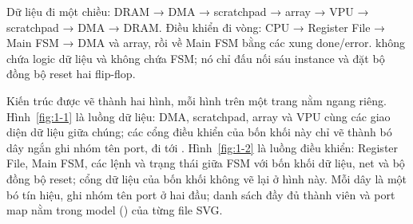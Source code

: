 Dữ liệu đi một chiều: DRAM → DMA → scratchpad → array → VPU → scratchpad → DMA → DRAM. Điều khiển đi
vòng: CPU → Register File → Main FSM → DMA và array, rồi về Main FSM bằng các xung done/error.
 không chứa logic dữ liệu và không chứa FSM; nó chỉ đấu nối sáu instance và đặt
bộ đồng bộ reset hai flip-flop.

Kiến trúc được vẽ thành hai hình, mỗi hình trên một trang nằm ngang riêng. Hình~\ref{fig:1-1} là
luồng dữ liệu: DMA, scratchpad, array và VPU cùng các giao diện dữ liệu giữa chúng; các cổng điều khiển
của bốn khối này chỉ vẽ thành bó dây ngắn ghi nhóm tên port, đi tới . Hình~\ref{fig:1-2}
là luồng điều khiển: Register File, Main FSM, các lệnh và trạng thái giữa FSM với bốn khối dữ liệu, net
 và bộ đồng bộ reset; cổng dữ liệu của bốn khối không vẽ lại ở hình này. Mỗi dây là một
bó tín hiệu, ghi nhóm tên port ở hai đầu; danh sách đầy đủ thành viên và port map nằm trong model
() của từng file SVG.



